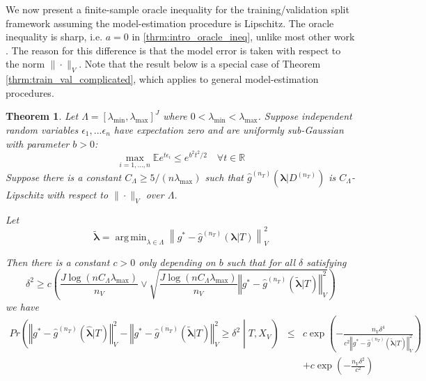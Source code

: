 \documentclass[12pt]{article}
\newtheorem{theorem}{Theorem}
\DeclareMathOperator*{\argmin}{arg\,min}
\begin{document}
We now present a finite-sample oracle inequality for the training/validation split framework assuming the model-estimation procedure is Lipschitz. The oracle inequality is sharp, i.e. $a=0$ in \eqref{thrm:intro_oracle_ineq}, unlike most other work \citep{gyorfi2006distribution, lecue2012oracle, van2003unified}. The reason for this difference is that the model error is taken with respect to the norm $\| \cdot \|_V$. Note that the result below is a special case of Theorem \ref{thrm:train_val_complicated}, which applies to general model-estimation procedures. 
\begin{theorem}
\label{thrm:train_val}
Let $\Lambda=[\lambda_{\min},\lambda_{\max}]^{J}$ where $0 < \lambda_{\min} < \lambda_{\max}$. Suppose independent random variables $\epsilon_1, ... \epsilon_n$ have expectation zero and are uniformly sub-Gaussian with parameter $b > 0$:
$$
\max_{i=1,...,n} \mathbb{E} e^{t \epsilon_i} \le e^{b^2t^2/2} \quad \forall t \in \mathbb{R}
$$
Suppose there is a constant $C_\Lambda \ge 5/(n \lambda_{\max})$ such that $\hat g^{(n_T)}(\boldsymbol{\lambda} |D^{(n_T)})$ is $C_\Lambda$-Lipschitz with respect to $\| \cdot \|_V$ over $\Lambda$.

Let 
\begin{equation}
\tilde{\boldsymbol \lambda} = \argmin_{\lambda \in \Lambda} \left \| g^*-\hat{g}^{(n_T)}( \boldsymbol{\lambda} | T) \right \|_{V}^{2}
\end{equation}

Then there is a constant $c>0$ only depending on $b$ such that for all $\delta$ satisfying
\begin{equation}
\delta^{2}
\ge
c \left ( 
\frac{J\log (n C_\Lambda\lambda_{\max})}{n_{V}}
\vee 
\sqrt{\frac{J \log (n C_\Lambda \lambda_{\max})}{n_{V}}\left\Vert g^* - \hat{g}^{(n_T)}( \tilde{\boldsymbol{\lambda}} | T)\right\Vert_{V}^2}
\right )
\label{thrm:train_val_delta}
\end{equation}
we have
\begin{eqnarray*}
	Pr\left(
	\left\Vert g^* - \hat{g}^{(n_T)}( \hat{\boldsymbol{\lambda}} | T) \right\Vert _{V}^2 -
	\left\Vert g^* - \hat{g}^{(n_T)}( \tilde{\boldsymbol{\lambda}} | T) \right\Vert _{V}^2
	\ge\delta^2
	\middle | 
	T, X_V
	\right )
	&\le& c\exp\left(-\frac{n_{V}\delta^{4}}{
		c^{2}
		\left\Vert g^* - \hat{g}^{(n_T)}( \tilde{\boldsymbol{\lambda}} | T) \right\Vert _{V}^2
	}\right) \\
	&& +c\exp\left(-\frac{n_{V}\delta^{2}}{c^{2}}\right) \\
\end{eqnarray*}

\end{theorem}
\end{document}
